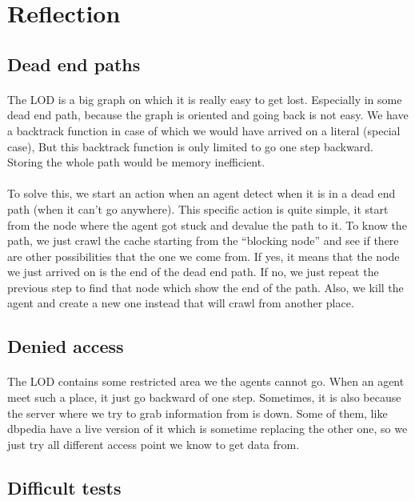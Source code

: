 \documentclass{article}
\begin{document}
\section{Reflection}
	\subsection{Dead end paths}
	\paragraph{}
	The LOD is a big graph on which it is really easy to get lost.
	Especially in some dead end path, because the graph is oriented and going back is not easy.
	We have a backtrack function in case of which we would have arrived on a literal (special case),
	But this backtrack function is only limited to go one step backward.
	Storing the whole path would be memory inefficient.
	\paragraph{}
	To solve this, we start an action when an agent detect when it is in a dead end path (when it can't go anywhere).
	This specific action is quite simple, it start from the node where the agent got stuck and devalue the path to it.
	To know the path, we just crawl the cache starting from the “blocking node”
	and see if there are other possibilities that the one we come from.
	If yes, it means that the node we just arrived on is the end of the dead end path.
	If no, we just repeat the previous step to find that node which show the end of the path.
	Also, we kill the agent and create a new one instead that will crawl from another place.
	\subsection{Denied access}
	\paragraph{}
	The LOD contains some restricted area we the agents cannot go.
	When an agent meet such a place, it just go backward of one step.
	Sometimes, it is also because the server where we try to grab information from is down.
	Some of them, like dbpedia have a live version of it which is sometime replacing the other one,
	so we just try all different access point we know to get data from.
	\subsection{Difficult tests}
\end{document}
